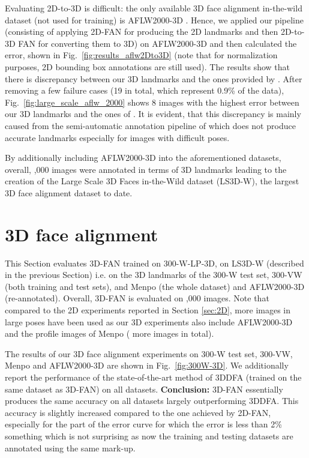	Evaluating 2D-to-3D is difficult: the only available 3D face alignment in-the-wild dataset (not used for training) is AFLW2000-3D \cite{zhu2016face}. Hence, we applied our pipeline (consisting of applying 2D-FAN for producing the 2D landmarks and then 2D-to-3D FAN for converting them to 3D) on AFLW2000-3D and then calculated the error, shown in Fig.~\ref{fig:results_aflw2Dto3D} (note that for normalization purposes, 2D bounding box annotations are still used). The results show that there is discrepancy between our 3D landmarks and the ones provided by \cite{zhu2016face}. After removing a few failure cases (19 in total, which represent 0.9\% of the data), Fig.~\ref{fig:large_scale_aflw_2000} shows 8 images with the highest error between our 3D landmarks and the ones of \cite{zhu2016face}. It is evident, that this discrepancy is mainly caused from the semi-automatic annotation pipeline of \cite{zhu2016face} which does not produce accurate landmarks especially for images with difficult poses.  

	By additionally including AFLW2000-3D into the aforementioned datasets, overall, ,000 images were annotated in terms of 3D landmarks leading to the creation of the Large Scale 3D Faces in-the-Wild dataset (LS3D-W), the largest 3D face alignment dataset to date.

	\section{3D face alignment} \label{sec:3D}

	This Section evaluates 3D-FAN trained on 300-W-LP-3D, on LS3D-W (described in the previous Section) i.e. on the 3D landmarks of the 300-W test set, 300-VW (both training and test sets), and Menpo (the whole dataset) and AFLW2000-3D (re-annotated). Overall, 3D-FAN is evaluated on ,000 images. Note that compared to the 2D experiments reported in Section \ref{sec:2D}, more images in large poses have been used as our 3D experiments also include AFLW2000-3D and the profile images of Menpo ( more images in total).  

	The results of our 3D face alignment experiments on 300-W test set, 300-VW, Menpo and AFLW2000-3D are shown in Fig.~\ref{fig:300W-3D}. We additionally report the performance of the state-of-the-art method of 3DDFA (trained on the same dataset as 3D-FAN) on all datasets.  \textbf{Conclusion:} 3D-FAN essentially produces the same accuracy on all datasets largely outperforming 3DDFA. This accuracy is slightly increased compared to the one achieved by 2D-FAN, especially for the part of the error curve for which the error is less than 2\% something which is not surprising as now the training and testing datasets are annotated using the same mark-up.

